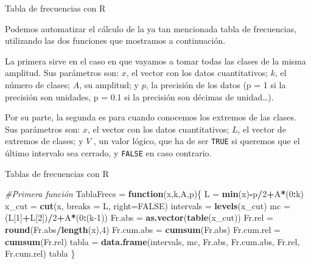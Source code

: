 \documentclass[
  ignorenonframetext,
]{beamer}
\newenvironment{Shaded}{\begin{snugshade}}{\end{snugshade}}
\newcommand{\CommentTok}[1]{\textcolor[rgb]{0.56,0.35,0.01}{\textit{#1}}}
\newcommand{\ControlFlowTok}[1]{\textcolor[rgb]{0.13,0.29,0.53}{\textbf{#1}}}
\newcommand{\DataTypeTok}[1]{\textcolor[rgb]{0.13,0.29,0.53}{#1}}
\newcommand{\DecValTok}[1]{\textcolor[rgb]{0.00,0.00,0.81}{#1}}
\newcommand{\KeywordTok}[1]{\textcolor[rgb]{0.13,0.29,0.53}{\textbf{#1}}}
\newcommand{\NormalTok}[1]{#1}
\newcommand{\OperatorTok}[1]{\textcolor[rgb]{0.81,0.36,0.00}{\textbf{#1}}}
\newcommand{\OtherTok}[1]{\textcolor[rgb]{0.56,0.35,0.01}{#1}}
\newcommand{\StringTok}[1]{\textcolor[rgb]{0.31,0.60,0.02}{#1}}
\begin{document}
\begin{frame}[fragile]{Tabla de frecuencias con R}
\protect\hypertarget{tabla-de-frecuencias-con-r}{}

Podemos automatizar el cálculo de la ya tan mencionada tabla de
frecuencias, utilizando las dos funciones que mostramos a continuación.

La primera sirve en el caso en que vayamos a tomar todas las clases de
la misma amplitud. Sus parámetros son: \(x\), el vector con los datos
cuantitativos; \(k\), el número de clases; \(A\), su amplitud; y \(p\),
la precisión de los datos (p = 1 si la precisión son unidades, p = 0.1
si la precisión son décimas de unidad\ldots).

Por su parte, la segunda es para cuando conocemos los extremos de las
clases. Sus parámetros son: \(x\), el vector con los datos
cuantitativos; \(L\), el vector de extremos de clases; y \(V\) , un
valor lógico, que ha de ser \texttt{TRUE} si queremos que el último
intervalo sea cerrado, y \texttt{FALSE} en caso contrario.

\end{frame}

\begin{frame}[fragile]{Tablas de frecuencias con R}
\protect\hypertarget{tablas-de-frecuencias-con-r}{}

\begin{Shaded}
\begin{Highlighting}[]
\CommentTok{#Primera función}
\NormalTok{TablaFrecs =}\StringTok{ }\ControlFlowTok{function}\NormalTok{(x,k,A,p)\{ }
\NormalTok{  L =}\StringTok{ }\KeywordTok{min}\NormalTok{(x)}\OperatorTok{-}\NormalTok{p}\OperatorTok{/}\DecValTok{2}\OperatorTok{+}\NormalTok{A}\OperatorTok{*}\NormalTok{(}\DecValTok{0}\OperatorTok{:}\NormalTok{k)}
\NormalTok{  x_cut =}\StringTok{ }\KeywordTok{cut}\NormalTok{(x, }\DataTypeTok{breaks =}\NormalTok{ L, }\DataTypeTok{right=}\OtherTok{FALSE}\NormalTok{)}
\NormalTok{  intervals =}\StringTok{ }\KeywordTok{levels}\NormalTok{(x_cut)}
\NormalTok{  mc =}\StringTok{ }\NormalTok{(L[}\DecValTok{1}\NormalTok{]}\OperatorTok{+}\NormalTok{L[}\DecValTok{2}\NormalTok{])}\OperatorTok{/}\DecValTok{2}\OperatorTok{+}\NormalTok{A}\OperatorTok{*}\NormalTok{(}\DecValTok{0}\OperatorTok{:}\NormalTok{(k}\DecValTok{-1}\NormalTok{))}
\NormalTok{  Fr.abs =}\StringTok{ }\KeywordTok{as.vector}\NormalTok{(}\KeywordTok{table}\NormalTok{(x_cut)) }
\NormalTok{  Fr.rel =}\StringTok{ }\KeywordTok{round}\NormalTok{(Fr.abs}\OperatorTok{/}\KeywordTok{length}\NormalTok{(x),}\DecValTok{4}\NormalTok{) }
\NormalTok{  Fr.cum.abs =}\StringTok{ }\KeywordTok{cumsum}\NormalTok{(Fr.abs) }
\NormalTok{  Fr.cum.rel =}\StringTok{ }\KeywordTok{cumsum}\NormalTok{(Fr.rel)}
\NormalTok{  tabla =}\StringTok{ }\KeywordTok{data.frame}\NormalTok{(intervals, mc, Fr.abs, Fr.cum.abs, Fr.rel, Fr.cum.rel)}
\NormalTok{  tabla}
\NormalTok{  \}}
\end{Highlighting}
\end{Shaded}

\end{frame}
\end{document}
